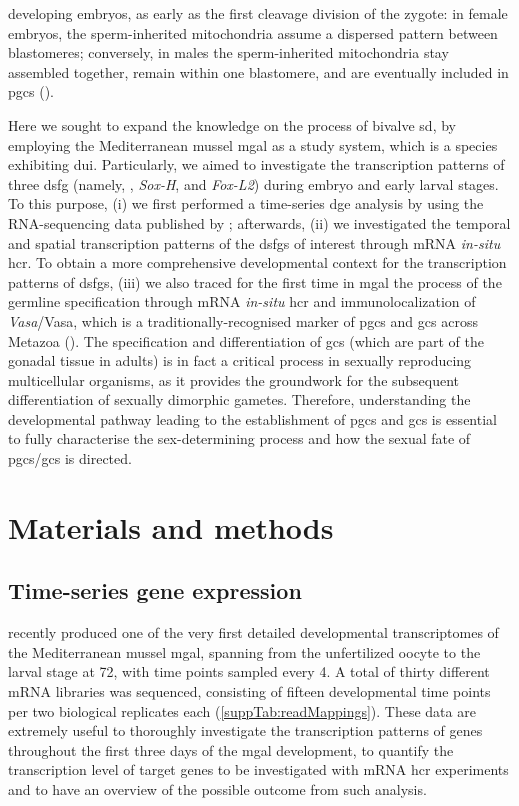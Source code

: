 developing embryos, as early as the first cleavage division of the zygote: in female embryos, the sperm-inherited mitochondria assume a dispersed pattern between blastomeres; conversely, in males the sperm-inherited mitochondria stay assembled together, remain within one blastomere, and are eventually included in \glspl{pgc} ().

Here we sought to expand the knowledge on the process of bivalve \gls{sd}, by employing the Mediterranean mussel \gls{mgal} as a study system, which is a species exhibiting \gls{dui}. Particularly, we aimed to investigate the transcription patterns of three \gls{dsfg} (namely, , \textit{Sox-H}, and \textit{Fox-L2}) during embryo and early larval stages. To this purpose, (i) we first performed a time-series \gls{dge} analysis by using the RNA-sequencing data published by ; afterwards, (ii) we investigated the temporal and spatial transcription patterns of the \glspl{dsfg} of interest through mRNA \textit{in-situ} \gls{hcr}. To obtain a more comprehensive developmental context for the transcription patterns of \glspl{dsfg}, (iii) we also traced for the first time in \gls{mgal} the process of the germline specification through mRNA \textit{in-situ} \gls{hcr} and immunolocalization of \textit{Vasa}/Vasa, which is a traditionally-recognised marker of \glspl{pgc} and \glspl{gc} across Metazoa (). The specification and differentiation of \glspl{gc} (which are part of the gonadal tissue in adults) is in fact a critical process in sexually reproducing multicellular organisms, as it provides the groundwork for the subsequent differentiation of sexually dimorphic gametes. Therefore, understanding the developmental pathway leading to the establishment of \glspl{pgc} and \glspl{gc} is essential to fully characterise the sex-determining process and how the sexual fate of \glspl{pgc}/\glspl{gc} is directed.

\section{Materials and methods} \label{chapter:insitu-MM}
\subsection{Time-series gene expression}
 recently produced one of the very first detailed developmental transcriptomes of the Mediterranean mussel \gls{mgal}, spanning from the unfertilized oocyte to the larval stage at \qty{72}{\hpf}, with time points sampled every \qty{4}{\hpf}. A total of thirty different mRNA libraries was sequenced, consisting of fifteen developmental time points per two biological replicates each (\cref{suppTab:readMappings}). These data are extremely useful to thoroughly investigate the transcription patterns of genes throughout the first three days of the \gls{mgal} development, to quantify the transcription level of target genes to be investigated with mRNA \gls{hcr} experiments and to have an overview of the possible outcome from such analysis.


